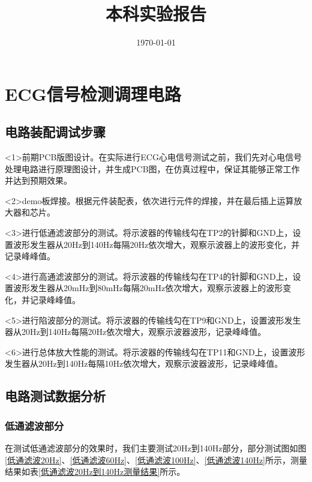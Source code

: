 \documentclass{zjureport}
\title{本科实验报告}
\date{\today}
\begin{document}
	\makecover
	
	\makecontent
	
	
	
	\section{ECG信号检测调理电路}
	
	\subsection{电路装配调试步骤}
	
	<1>前期PCB版图设计。在实际进行ECG心电信号测试之前，我们先对心电信号处理电路进行原理图设计，并生成PCB图，在仿真过程中，保证其能够正常工作并达到预期效果。
	
	<2>demo板焊接。根据元件装配表，依次进行元件的焊接，并在最后插上运算放大器和芯片。
	
	<3>进行低通滤波部分的测试。将示波器的传输线勾在TP2的针脚和GND上，设置波形发生器从20Hz到140Hz每隔20Hz依次增大，观察示波器上的波形变化，并记录峰峰值。
	
	<4>进行高通滤波部分的测试。将示波器的传输线勾在TP4的针脚和GND上，设置波形发生器从20mHz到80mHz每隔20mHz依次增大，观察示波器上的波形变化，并记录峰峰值。
	
	<5>进行陷波部分的测试。将示波器的传输线勾在TP9和GND上，设置波形发生器从20Hz到140Hz每隔20Hz依次增大，观察示波器波形，记录峰峰值。
	
	<6>进行总体放大性能的测试。将示波器的传输线勾在TP11和GND上，设置波形发生器从20Hz到140Hz每隔10Hz依次增大，观察示波器波形，记录峰峰值。
	
	\subsection{电路测试数据分析}
	
	\subsubsection{低通滤波部分}
	
	在测试低通滤波部分的效果时，我们主要测试20Hz到140Hz部分，部分测试图如图\ref{低通滤波20Hz}、\ref{低通滤波60Hz}、\ref{低通滤波100Hz}、\ref{低通滤波140Hz}所示，测量结果如表\ref{低通滤波20Hz到140Hz测量结果}所示。
	
\end{document}
